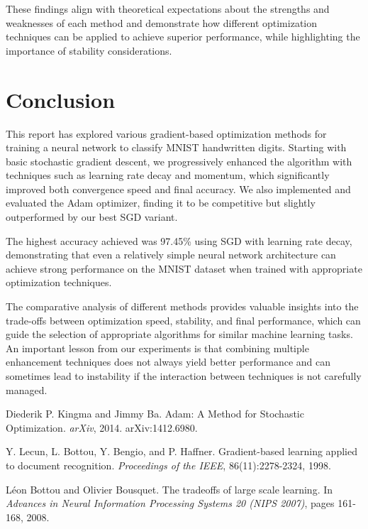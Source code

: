 \documentclass{article}
\begin{document}
These findings align with theoretical expectations about the strengths and weaknesses of each method and demonstrate how different optimization techniques can be applied to achieve superior performance, while highlighting the importance of stability considerations.

\section{Conclusion}

This report has explored various gradient-based optimization methods for training a neural network to classify MNIST handwritten digits. Starting with basic stochastic gradient descent, we progressively enhanced the algorithm with techniques such as learning rate decay and momentum, which significantly improved both convergence speed and final accuracy. We also implemented and evaluated the Adam optimizer, finding it to be competitive but slightly outperformed by our best SGD variant.

The highest accuracy achieved was 97.45\% using SGD with learning rate decay, demonstrating that even a relatively simple neural network architecture can achieve strong performance on the MNIST dataset when trained with appropriate optimization techniques.

The comparative analysis of different methods provides valuable insights into the trade-offs between optimization speed, stability, and final performance, which can guide the selection of appropriate algorithms for similar machine learning tasks. An important lesson from our experiments is that combining multiple enhancement techniques does not always yield better performance and can sometimes lead to instability if the interaction between techniques is not carefully managed.

\pagebreak

\begin{thebibliography}{9}

Diederik P. Kingma and Jimmy Ba. Adam: A Method for Stochastic Optimization. \textit{arXiv}, 2014. arXiv:1412.6980.

Y. Lecun, L. Bottou, Y. Bengio, and P. Haffner. Gradient-based learning applied to document recognition. \textit{Proceedings of the IEEE}, 86(11):2278-2324, 1998.

Léon Bottou and Olivier Bousquet. The tradeoffs of large scale learning. In \textit{Advances in Neural Information Processing Systems 20 (NIPS 2007)}, pages 161-168, 2008.

\end{thebibliography}
\end{document}
